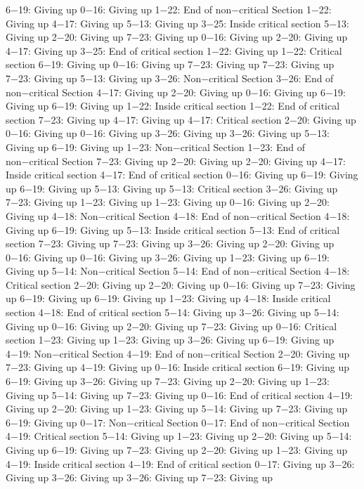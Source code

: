 6−19: Giving up
0−16: Giving up
1−22: End of non−critical Section
1−22: Giving up
4−17: Giving up
5−13: Giving up
3−25: Inside critical section
5−13: Giving up
2−20: Giving up
7−23: Giving up
0−16: Giving up
2−20: Giving up
4−17: Giving up
3−25: End of critical section
1−22: Giving up
1−22: Critical section
6−19: Giving up
0−16: Giving up
7−23: Giving up
7−23: Giving up
7−23: Giving up
5−13: Giving up
3−26: Non−critical Section
3−26: End of non−critical Section
4−17: Giving up
2−20: Giving up
0−16: Giving up
6−19: Giving up
6−19: Giving up
1−22: Inside critical section
1−22: End of critical section
7−23: Giving up
4−17: Giving up
4−17: Critical section
2−20: Giving up
0−16: Giving up
0−16: Giving up
3−26: Giving up
3−26: Giving up
5−13: Giving up
6−19: Giving up
1−23: Non−critical Section
1−23: End of non−critical Section
7−23: Giving up
2−20: Giving up
2−20: Giving up
4−17: Inside critical section
4−17: End of critical section
0−16: Giving up
6−19: Giving up
6−19: Giving up
5−13: Giving up
5−13: Critical section
3−26: Giving up
7−23: Giving up
1−23: Giving up
1−23: Giving up
0−16: Giving up
2−20: Giving up
4−18: Non−critical Section
4−18: End of non−critical Section
4−18: Giving up
6−19: Giving up
5−13: Inside critical section
5−13: End of critical section
7−23: Giving up
7−23: Giving up
3−26: Giving up
2−20: Giving up
0−16: Giving up
0−16: Giving up
3−26: Giving up
1−23: Giving up
6−19: Giving up
5−14: Non−critical Section
5−14: End of non−critical Section
4−18: Critical section
2−20: Giving up
2−20: Giving up
0−16: Giving up
7−23: Giving up
6−19: Giving up
6−19: Giving up
1−23: Giving up
4−18: Inside critical section
4−18: End of critical section
5−14: Giving up
3−26: Giving up
5−14: Giving up
0−16: Giving up
2−20: Giving up
7−23: Giving up
0−16: Critical section
1−23: Giving up
1−23: Giving up
3−26: Giving up
6−19: Giving up
4−19: Non−critical Section
4−19: End of non−critical Section
2−20: Giving up
7−23: Giving up
4−19: Giving up
0−16: Inside critical section
6−19: Giving up
6−19: Giving up
3−26: Giving up
7−23: Giving up
2−20: Giving up
1−23: Giving up
5−14: Giving up
7−23: Giving up
0−16: End of critical section
4−19: Giving up
2−20: Giving up
1−23: Giving up
5−14: Giving up
7−23: Giving up
6−19: Giving up
0−17: Non−critical Section
0−17: End of non−critical Section
4−19: Critical section
5−14: Giving up
1−23: Giving up
2−20: Giving up
5−14: Giving up
6−19: Giving up
7−23: Giving up
2−20: Giving up
1−23: Giving up
4−19: Inside critical section
4−19: End of critical section
0−17: Giving up
3−26: Giving up
3−26: Giving up
3−26: Giving up
7−23: Giving up
